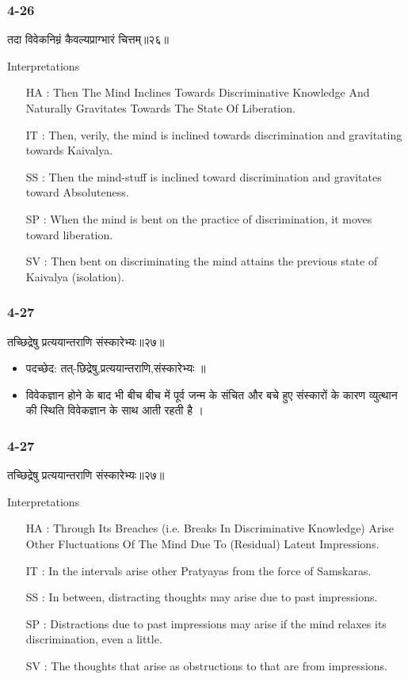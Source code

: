 \begin{frame}[fragile]\frametitle{4-26}
\begin{sanskrit}
तदा विवेकनिम्नं कैवल्यप्राग्भारं चित्तम्॥२६॥
\end{sanskrit}

Interpretations
\begin{itemize}	
\item [HA]: Then The Mind Inclines Towards Discriminative Knowledge And Naturally Gravitates Towards The State Of Liberation.
\item [IT]: Then, verily, the mind is inclined towards discrimination and gravitating towards Kaivalya.
\item [SS]: Then the mind-stuff is inclined toward discrimination and gravitates toward Absoluteness.
\item [SP]: When the mind is bent on the practice of discrimination, it moves toward liberation.
\item [SV]: Then bent on discriminating the mind attains the previous state of Kaivalya (isolation). 
\end{itemize}
\end{frame}

\begin{frame}[fragile]\frametitle{4-27}
\begin{sanskrit}
तच्छिद्रेषु प्रत्ययान्तराणि संस्कारेभ्यः॥२७॥
\end{sanskrit}

\begin{itemize}
\item पदच्छेद: तत्-छिद्रेषु,प्रत्ययान्तराणि,संस्कारेभ्यः‌ ॥
\item विवेकज्ञान होने के बाद भी बीच बीच में पूर्व जन्म के संचित और बचे हुए संस्कारों के कारण व्युत्थान की स्थिति विवेकज्ञान के साथ आती रहती है ।
\end{itemize}
\end{frame}


\begin{frame}[fragile]\frametitle{4-27}
\begin{sanskrit}
तच्छिद्रेषु प्रत्ययान्तराणि संस्कारेभ्यः॥२७॥
\end{sanskrit}

Interpretations
\begin{itemize}	
\item [HA]: Through Its Breaches (i.e. Breaks In Discriminative Knowledge) Arise Other Fluctuations Of The Mind Due To (Residual) Latent Impressions.
\item [IT]: In the intervals arise other Pratyayas from the force of Samskaras.
\item [SS]: In between, distracting thoughts may arise due to past impressions.
\item [SP]: Distractions due to past impressions may arise if the mind relaxes its discrimination, even a little.
\item [SV]: The thoughts that arise as obstructions to that are from impressions. 
\end{itemize}
\end{frame}


